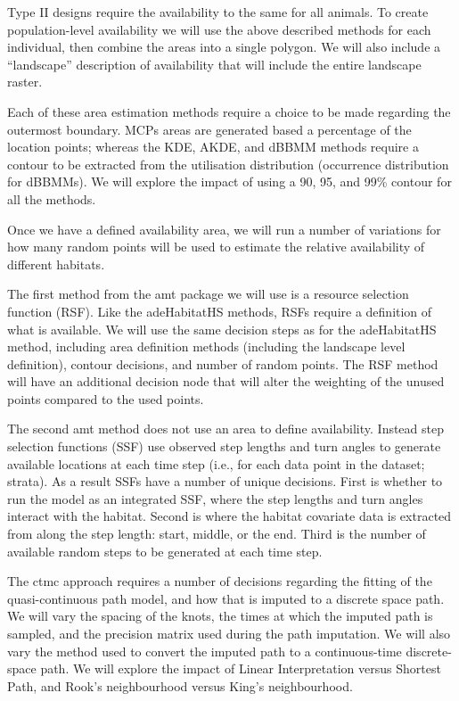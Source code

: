 \documentclass[10pt,a4paper]{article}
\begin{document}
Type II designs require the availability to the same for all animals.
To create population-level availability we will use the above described methods for each individual, then combine the areas into a single polygon.
We will also include a ``landscape'' description of availability that will include the entire landscape raster.

Each of these area estimation methods require a choice to be made regarding the outermost boundary.
MCPs areas are generated based a percentage of the location points; whereas the KDE, AKDE, and dBBMM methods require a contour to be extracted from the utilisation distribution (occurrence distribution for dBBMMs).
We will explore the impact of using a 90, 95, and 99\% contour for all the methods.

Once we have a defined availability area, we will run a number of variations for how many random points will be used to estimate the relative availability of different habitats.

The first method from the amt package we will use is a resource selection function (RSF).
Like the adeHabitatHS methods, RSFs require a definition of what is available.
We will use the same decision steps as for the adeHabitatHS method, including area definition methods (including the landscape level definition), contour decisions, and number of random points.
The RSF method will have an additional decision node that will alter the weighting of the unused points compared to the used points.

The second amt method does not use an area to define availability.
Instead step selection functions (SSF) use observed step lengths and turn angles to generate available locations at each time step (i.e., for each data point in the dataset; strata).
As a result SSFs have a number of unique decisions.
First is whether to run the model as an integrated SSF, where the step lengths and turn angles interact with the habitat.
Second is where the habitat covariate data is extracted from along the step length: start, middle, or the end.
Third is the number of available random steps to be generated at each time step.

The ctmc approach requires a number of decisions regarding the fitting of the quasi-continuous path model, and how that is imputed to a discrete space path.
We will vary the spacing of the knots, the times at which the imputed path is sampled, and the precision matrix used during the path imputation.
We will also vary the method used to convert the imputed path to a continuous-time discrete-space path.
We will explore the impact of Linear Interpretation versus Shortest Path, and Rook's neighbourhood versus King's neighbourhood.
\end{document}
